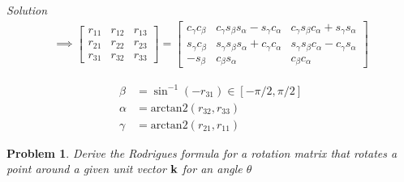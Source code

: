 \documentclass{article}
\newtheorem{prob}{Problem}
\numberwithin{prob}{section}
\newenvironment{solution}{\emph{Solution}}{}
\begin{document}
\begin{solution}
\begin{align}
  \implies \begin{bmatrix}
    r_{11} & r_{12} & r_{13}  \\
    r_{21} & r_{22} & r_{23}  \\
    r_{31} & r_{32} & r_{33}  
  \end{bmatrix}
  = \begin{bmatrix}
    c_\gamma c_\beta &
    c_\gamma s_\beta s_\alpha - s_\gamma c_\alpha &
    c_\gamma s_\beta c_\alpha + s_\gamma s_\alpha
    \\
    s_\gamma c_\beta &
    s_\gamma s_\beta s_\alpha + c_\gamma c_\alpha &
    s_\gamma s_\beta c_\alpha - c_\gamma s_\alpha
    \\
    -s_\beta & c_\beta s_\alpha & c_\beta c_\alpha
  \end{bmatrix}
\end{align}

\begin{align}
  \beta &= \sin^{-1}(-r_{31}) \in [-\pi/2, \pi/2]\\
  \alpha &= \text{arctan2}(r_{32}, r_{33}) \\
  \gamma &= \text{arctan2}(r_{21}, r_{11})
\end{align}

\end{solution}

\begin{prob}
  Derive the Rodrigues formula for a rotation matrix that rotates a point around a given unit vector $\mathbf{k}$ for an angle $\theta$
\end{prob}
\end{document}
